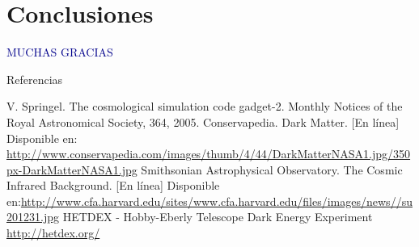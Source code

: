 \documentclass{beamer}
\begin{document}
\section{Conclusiones}


	\begin{frame}
		\begin{center}
			\textcolor{darkblue}{\Huge{MUCHAS GRACIAS}}
		\end{center}
		
	\end{frame}
	\begin{frame}[allowframebreaks]{Referencias}
		\begin{thebibliography}{}
			 V. Springel. The cosmological simulation code gadget-2. Monthly Notices of the Royal Astronomical Society, 364, 2005.
			 Conservapedia. Dark Matter. [En línea] Disponible en: \url{http://www.conservapedia.com/images/thumb/4/44/DarkMatterNASA1.jpg/350px-DarkMatterNASA1.jpg}
			 Smithsonian Astrophysical Observatory. The Cosmic Infrared Background. [En línea] Disponible en:\url{http://www.cfa.harvard.edu/sites/www.cfa.harvard.edu/files/images/news//su201231.jpg}	
			 HETDEX - Hobby-Eberly Telescope Dark Energy Experiment \url{http://hetdex.org/}
			
	\end{thebibliography}
%	
%	
	\end{frame}
\end{document}

